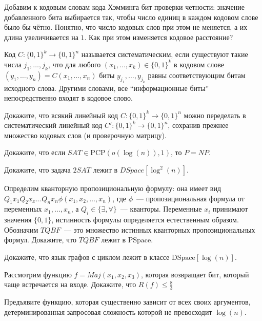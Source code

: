 \begin{task}
	Добавим к кодовым словам кода Хэмминга бит проверки четности: значение
	добавленного бита выбирается так, чтобы число единиц в каждом кодовом слове было
    бы чётно. Понятно, что число кодовых слов при этом не меняется, а их длина
    увеличивается на $1$. Как при этом изменяется кодовое расстояние?
\end{task}

\begin{task}
    Код $C: \{0, 1\}^k \rightarrow \{0, 1\}^n$ называется систематическим, если
    существуют такие числа $j_1, \dots, j_k$, что для любого $(x_1, \dots, x_k) \in
    \{0, 1\}^k$ в кодовом слове $(y_1, \dots, y_n) = C(x_1, \dots, x_n)$ биты
    $y_{j_1}, \dots, y_{j_k}$ равны соответствующим битам исходного слова. Другими
    словами, все ``информационные биты'' непосредственно входят в кодовое слово.

    Докажите, что всякий линейный код $C: \{0, 1\}^k \rightarrow \{0, 1\}^n$ можно
    переделать в систематический линейный код $C': \{0, 1\}^k \rightarrow \{0,
    1\}^n$, сохранив прежнее множество кодовых слов (и проверочную матрицу).
\end{task}


\breakline

\begin{ptask}{39}
    Докажите, что если $SAT \in \mathrm{PCP}(o(\log(n)), 1)$, то $P = NP$.
\end{ptask}

\begin{ptask}{41}
	Докажите, что задача $2SAT$ лежит в $DSpace[\log^2(n)]$.    
\end{ptask}

\begin{ptask}{42}
	Определим кванторную пропозициональную формулу: она имеет вид \\
    $Q_1 x_1 Q_2 x_x \dots Q_n x_n \phi(x_1, x_2, \dots, x_n)$, где $\phi$~---
    пропозициональная формула от переменных $x_1, \dots, x_n$, а $Q_i \in \{\exists,
    \forall\}$~--- кванторы. Переменные $x_i$ принимают значения $\{0, 1\}$,
    истинность формулы определяется естественным образом. Обозначим $TQBF$~--- это
    множество истинных кванторных пропозициональных формул. Докажите, что $TQBF$
    лежит в $\mathrm{PSpace}$.
\end{ptask}

\begin{ptask}{43}
    Докажите, что язык графов с циклом лежит в классе $\mathrm{DSpace}[\log(n)]$.
\end{ptask}

\begin{ptask}{45}
    Рассмотрим функцию $f = Maj(x_1, x_2, x_3)$, которая возвращает бит, который чаще
    встречается на входе. Докажите, что $R(f) \le \frac{8}{3}$
\end{ptask}

\begin{ptask}{47}
    Предъявите функцию, которая существенно зависит от всех своих аргументов,
    детерминированная запросовая сложность которой не превосходит $\log(n)$.
\end{ptask}